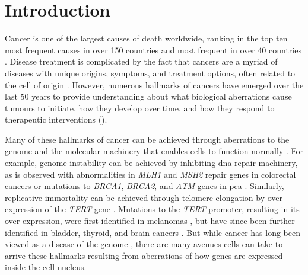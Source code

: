 \chapter{Introduction}
\label{chap:intro}

Cancer is one of the largest causes of death worldwide, ranking in the top ten most frequent causes in over 150 countries and most frequent in over 40 countries \cite{brayGlobalCancerStatistics2018}.
Disease treatment is complicated by the fact that cancers are a myriad of diseases with unique origins, symptoms, and treatment options, often related to the cell of origin \cite{gilbertsonMappingCancerOrigins2011}.
However, numerous hallmarks of cancers have emerged over the last 50 years to provide understanding about what biological aberrations cause tumours to initiate, how they develop over time, and how they respond to therapeutic interventions \cite{hanahanHallmarksCancer2000,hanahanHallmarksCancerNext2011,flavahanEpigeneticPlasticityHallmarks2017,pavlovaEmergingHallmarksCancer2016} ().


Many of these hallmarks of cancer can be achieved through aberrations to the genome and the molecular machinery that enables cells to function normally \cite{garrawayLessonsCancerGenome2013}.
For example, genome instability can be achieved by inhibiting \gls{dna} repair machinery, as is observed with abnormalities in \emph{MLH1} and \emph{MSH2} repair genes in colorectal cancers \cite{lengauerGeneticInstabilitiesHuman1998} or mutations to \emph{BRCA1}, \emph{BRCA2}, and \emph{ATM} genes in \gls{pca} \cite{abeshouseMolecularTaxonomyPrimary2015}.
Similarly, replicative immortality can be achieved through telomere elongation by over-expression of the \emph{TERT} gene \cite{vinagreFrequencyTERTPromoter2013}.
Mutations to the \emph{TERT} promoter, resulting in its over-expression, were first identified in melanomas \cite{huangHighlyRecurrentTERT2013,hornTERTPromoterMutations2013}, but have since been further identified in bladder, thyroid, and brain cancers \cite{vinagreFrequencyTERTPromoter2013,nagarajanRecurrentEpimutationsActivate2014,sternMutationTERTPromoter2015}.
But while cancer has long been viewed as a disease of the genome \cite{hanahanHallmarksCancer2000,garrawayLessonsCancerGenome2013}, there are many avenues cells can take to arrive these hallmarks resulting from aberrations of how genes are expressed inside the cell nucleus.

